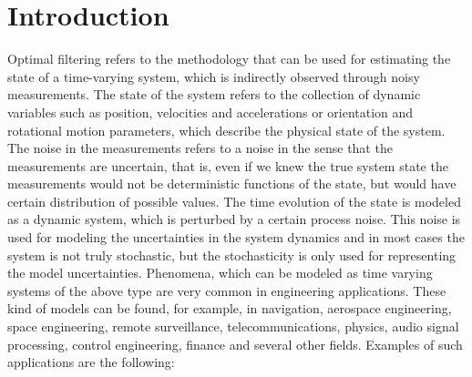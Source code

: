 \documentclass[10pt]{llncs}
\begin{document}
\section{Introduction}
Optimal filtering refers to the methodology that can be used for estimating the
state of a time-varying system, which is indirectly observed through noisy measurements. The state of the system refers to the collection of dynamic variables
such as position, velocities and accelerations or orientation and rotational motion
parameters, which describe the physical state of the system. The noise in the measurements refers to a noise in the sense that the measurements are uncertain, that is,
even if we knew the true system state the measurements would not be deterministic
functions of the state, but would have certain distribution of possible values. The
time evolution of the state is modeled as a dynamic system, which is perturbed
by a certain process noise. This noise is used for modeling the uncertainties in
the system dynamics and in most cases the system is not truly stochastic, but the
stochasticity is only used for representing the model uncertainties.
Phenomena, which can be modeled as time varying systems of the above type are
very common in engineering applications. These kind of models can be found, for
example, in navigation, aerospace engineering, space engineering, remote surveillance, telecommunications, physics, audio signal processing, control engineering,
finance and several other fields. Examples of such applications are the following:
\end{document}
